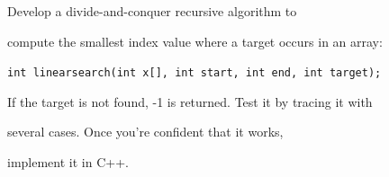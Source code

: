 Develop a divide-and-conquer recursive algorithm to

compute the smallest index value where a target occurs in an array:



\verb!int linearsearch(int x[], int start, int end, int target);!



If the target is not found, -1 is returned. Test it by tracing it with

several cases. Once you're confident that it works,

implement it in C++.

